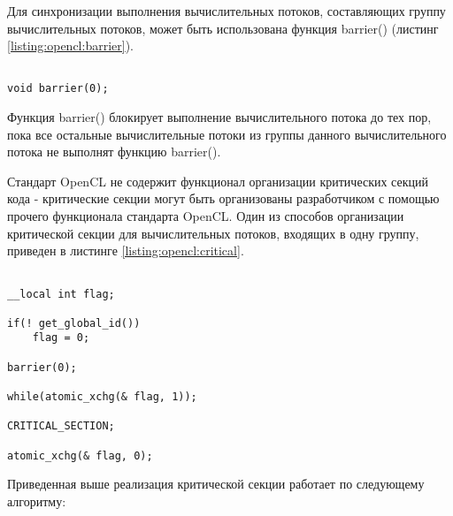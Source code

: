 
		Для синхронизации выполнения вычислительных потоков, составляющих группу вычислительных потоков, может быть использована функция barrier() (листинг \ref{listing:opencl:barrier}).

\begin{lstlisting}

void barrier(0);

\end{lstlisting}
\mylistingend

		Функция barrier() блокирует выполнение вычислительного потока до тех пор, пока все остальные вычислительные потоки из группы данного вычислительного потока не выполнят функцию barrier().

		Стандарт OpenCL не содержит функционал организации критических секций кода - критические секции могут быть организованы разработчиком с помощью прочего функционала стандарта OpenCL. Один из способов организации критической секции для вычислительных потоков, входящих в одну группу, приведен в листинге \ref{listing:opencl:critical}.

\begin{lstlisting}

__local int flag;

if(! get_global_id())
	flag = 0;

barrier(0);

while(atomic_xchg(& flag, 1));

CRITICAL_SECTION;

atomic_xchg(& flag, 0);

\end{lstlisting}
\mylistingend

	Приведенная выше реализация критической секции работает по следующему алгоритму:


